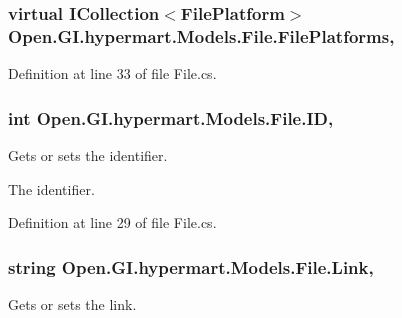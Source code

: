 \subsubsection[{File\+Platforms}]{\setlength{\rightskip}{0pt plus 5cm}virtual I\+Collection$<${\bf File\+Platform}$>$ Open.\+G\+I.\+hypermart.\+Models.\+File.\+File\+Platforms\hspace{0.3cm}{\ttfamily [get]}, {\ttfamily [set]}}\label{class_open_1_1_g_i_1_1hypermart_1_1_models_1_1_file_ac075b378d09c288deda822c0ea6b854c}


Definition at line 33 of file File.\+cs.

\hypertarget{class_open_1_1_g_i_1_1hypermart_1_1_models_1_1_file_ade215e549b777e8f30cfa19ec28cff96}{}
\subsubsection[{I\+D}]{\setlength{\rightskip}{0pt plus 5cm}int Open.\+G\+I.\+hypermart.\+Models.\+File.\+I\+D\hspace{0.3cm}{\ttfamily [get]}, {\ttfamily [set]}}\label{class_open_1_1_g_i_1_1hypermart_1_1_models_1_1_file_ade215e549b777e8f30cfa19ec28cff96}


Gets or sets the identifier. 

The identifier. 

Definition at line 29 of file File.\+cs.

\hypertarget{class_open_1_1_g_i_1_1hypermart_1_1_models_1_1_file_a47b36d33252b1a1f58bee02a94d11dd5}{}
\subsubsection[{Link}]{\setlength{\rightskip}{0pt plus 5cm}string Open.\+G\+I.\+hypermart.\+Models.\+File.\+Link\hspace{0.3cm}{\ttfamily [get]}, {\ttfamily [set]}}\label{class_open_1_1_g_i_1_1hypermart_1_1_models_1_1_file_a47b36d33252b1a1f58bee02a94d11dd5}


Gets or sets the link. 

